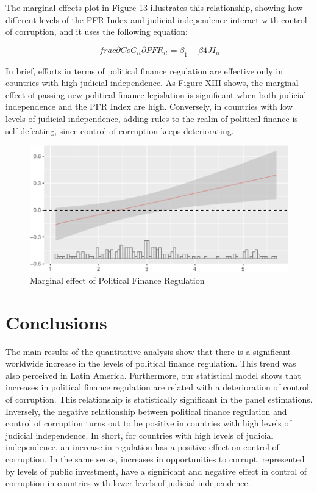\documentclass[12,twoside]{article}
\begin{document}
The marginal effects plot in Figure 13 illustrates this relationship,
showing how different levels of the PFR Index and judicial independence
interact with control of corruption, and it uses the following equation:

\begin{equation}
\ frac{\partial CoC_{it}}{\partial PFR_{it}} =  \beta_{1} + \beta{4} JI_{it}
\end{equation}

In brief, efforts in terms of political finance regulation are effective
only in countries with high judicial independence. As Figure XIII shows,
the marginal effect of passing new political finance legislation is
significant when both judicial independence and the PFR Index are high.
Conversely, in countries with low levels of judicial independence,
adding rules to the realm of political finance is self-defeating, since
control of corruption keeps deteriorating.

\begin{figure}[h]

{\centering \includegraphics{thesis_body_files/figure-latex/figure_xiii-1} 

}

\caption{Marginal effect of Political Finance Regulation}\label{fig:figure_xiii}
\end{figure}

\section{Conclusions}\label{conclusions}

The main results of the quantitative analysis show that there is a
significant worldwide increase in the levels of political finance
regulation. This trend was also perceived in Latin America. Furthermore,
our statistical model shows that increases in political finance
regulation are related with a deterioration of control of corruption.
This relationship is statistically significant in the panel estimations.
Inversely, the negative relationship between political finance
regulation and control of corruption turns out to be positive in
countries with high levels of judicial independence. In short, for
countries with high levels of judicial independence, an increase in
regulation has a positive effect on control of corruption. In the same
sense, increases in opportunities to corrupt, represented by levels of
public investment, have a significant and negative effect in control of
corruption in countries with lower levels of judicial independence.
\end{document}

